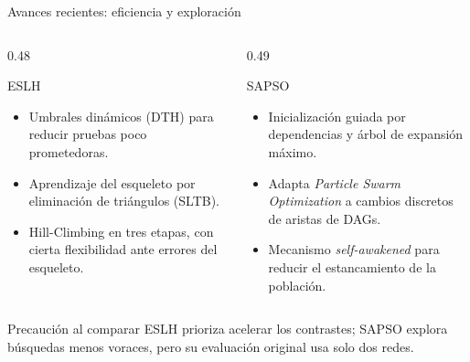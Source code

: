 \documentclass[aspectratio=169,11pt]{beamer}
\begin{document}
\begin{frame}[t]{Avances recientes: eficiencia y exploración}
  \begin{columns}[T,onlytextwidth]
    \begin{column}{0.48\textwidth}
      \begin{block}{ESLH}
        \begin{itemize}
          \item Umbrales dinámicos (DTH) para reducir pruebas poco prometedoras.
          \item Aprendizaje del esqueleto por eliminación de triángulos (SLTB).
          \item Hill-Climbing en tres etapas, con cierta flexibilidad ante errores del esqueleto.
        \end{itemize}
      \end{block}
    \end{column}
    \begin{column}{0.49\textwidth}
      \begin{block}{SAPSO}
        \begin{itemize}
          \item Inicialización guiada por dependencias y árbol de expansión máximo.
          \item Adapta \textit{Particle Swarm Optimization} a cambios discretos de aristas de DAGs.
          \item Mecanismo \textit{self-awakened} para reducir el estancamiento de la población.
        \end{itemize}
      \end{block}
    \end{column}
  \end{columns}
  \vspace{0.12cm}
  \begin{alertblock}{Precaución al comparar}
    ESLH prioriza acelerar los contrastes; SAPSO explora búsquedas menos voraces, pero su evaluación original usa solo dos redes.
  \end{alertblock}
\end{frame}
\end{document}

